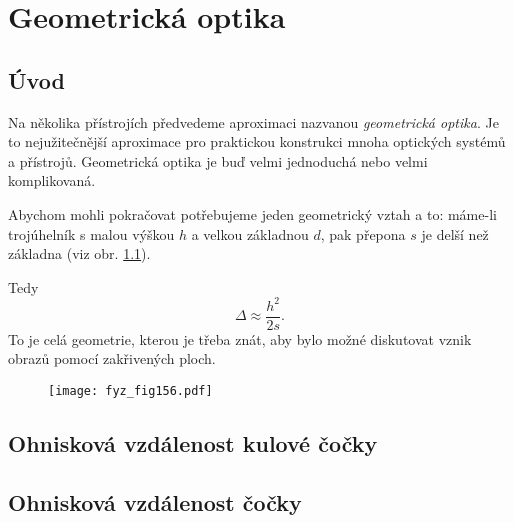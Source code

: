 {
\chapter{Geometrická optika}\label{fyz:IchapXXVII}
\minitoc

  \section{Úvod}\label{fyz:IchapXXVIIsecI}
    Na několika přístrojích předvedeme aproximaci nazvanou \emph{geometrická optika}. Je to
    nejužitečnější aproximace pro praktickou konstrukci mnoha optických systémů a přístrojů.
    Geometrická optika je buď velmi jednoduchá nebo velmi komplikovaná.
    
    Abychom mohli pokračovat potřebujeme jeden geometrický vztah a to: máme-li trojúhelník s malou
    výškou $h$ a velkou základnou $d$, pak přepona $s$ je delší než základna (viz obr.
    \ref{fyz:fig156}).  
    
    Tedy 
    \begin{equation}\label{FYZ:eq_triangle}
     \Delta \approx \frac{h^2}{2s}.
    \end{equation}
    To je celá geometrie, kterou je třeba znát, aby bylo možné diskutovat vznik obrazů pomocí
    zakřivených ploch.
    
    \begin{figure}[ht!]
      \centering
      \texttt{[image: fyz\_fig156.pdf]}
      \label{fyz:fig156}  
    \end{figure}

  \section{Ohnisková vzdálenost kulové čočky}\label{fyz:IchapXXVIIsecII}
  \section{Ohnisková vzdálenost čočky}\label{fyz:IchapXXVIIsecIII}
}
